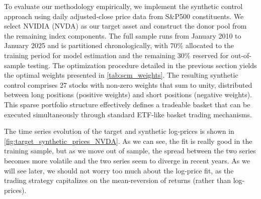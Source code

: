 
To evaluate our methodology empirically, we implement the synthetic control approach using daily adjusted-close price data from S\&P500 constituents. We select NVIDIA (NVDA) as our target asset and construct the donor pool from the remaining index components. The full sample runs from January 2010 to January 2025 and is partitioned chronologically, with 70\% allocated to the training period for model estimation and the remaining 30\% reserved for out-of-sample testing. The optimization procedure detailed in the previous section yields the optimal weights presented in \cref{tab:scm_weights}. The resulting synthetic control comprises 27 stocks with non-zero weights that sum to unity, distributed between long positions (positive weights) and short positions (negative weights). This sparse portfolio structure effectively defines a tradeable basket that can be executed simultaneously through standard ETF-like basket trading mechanisms.



The time series evolution of the target and synthetic log-prices is shown in \cref{fig:target_synthetic_prices_NVDA}. As we can see, the fit is really good in the training sample, but as we move out of sample, the spread between the two series becomes more volatile and the two series seem to diverge in recent years. As we will see later, we should not worry too much about the log-price fit, as the trading strategy capitalizes on the mean-reversion of returns (rather than log-prices).

